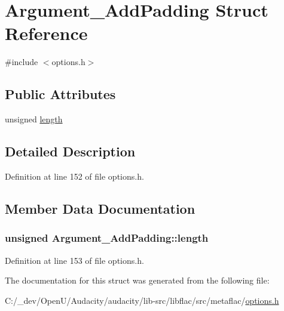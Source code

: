 \hypertarget{struct_argument___add_padding}{}\section{Argument\+\_\+\+Add\+Padding Struct Reference}
\label{struct_argument___add_padding}


{\ttfamily \#include $<$options.\+h$>$}

\subsection*{Public Attributes}
\begin{DoxyCompactItemize}
\item 
unsigned \hyperlink{struct_argument___add_padding_a549804ac5345067969e7fce9386b2435}{length}
\end{DoxyCompactItemize}


\subsection{Detailed Description}


Definition at line 152 of file options.\+h.



\subsection{Member Data Documentation}
\subsubsection[{\texorpdfstring{length}{length}}]{\setlength{\rightskip}{0pt plus 5cm}unsigned Argument\+\_\+\+Add\+Padding\+::length}\hypertarget{struct_argument___add_padding_a549804ac5345067969e7fce9386b2435}{}\label{struct_argument___add_padding_a549804ac5345067969e7fce9386b2435}


Definition at line 153 of file options.\+h.



The documentation for this struct was generated from the following file\+:\begin{DoxyCompactItemize}
\item 
C\+:/\+\_\+dev/\+Open\+U/\+Audacity/audacity/lib-\/src/libflac/src/metaflac/\hyperlink{libflac_2src_2metaflac_2options_8h}{options.\+h}\end{DoxyCompactItemize}
